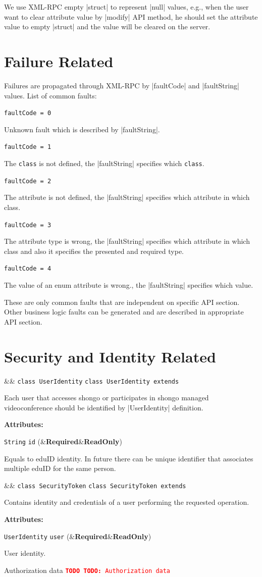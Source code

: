 \documentclass[a4paper]{report}
\newenvironment{Api}{\begin{itemize}}{\end{itemize}}
\newcommand{\ApiCode}[1]{\lstinline[style=styleApi]|#1|}
\newcommand{\ApiValue}[1]{\verb|#1|}
\newcommand{\ApiItem}[1]{\item #1 %

}
\newcommand{\ApiClass}[2]{\ApiItem{%
  \ifx&#2& \ApiCode{class #1} \else \ApiCode{class #1 extends #2} \fi}%
}
\newenvironment{ApiClassAttributes}{%

\begin{samepage}\textbf{Attributes:}\begin{compactitem}}{\end{compactitem}\end{samepage}}
\newcommand{\ApiRequired}{{\color{blue!50!black}\textbf{Required}}}
\newcommand{\ApiReadOnly}{{\color{red!50!black}\textbf{ReadOnly}}}
\newcommand{\ApiClassAttribute}[3]{\ApiItem{\ApiCode{#2} \ApiCode{#1} \hspace{1mm}(\ifx&#3&\ApiReadOnly\else#3\fi)
}}
\newenvironment{ApiFailures}{\begin{compactitem}}{\end{compactitem}}
\newcommand{\ApiFailure}[1]{\ApiItem{\ApiCode{faultCode = #1}}}
\newcommand{\TODO}[1]{%
\def\empty{}%
\def\prvniparametr{#1}%
\ifx\prvniparametr\empty%
\begingroup\tt\textcolor{red}{\noindent\textbf{TODO}}\endgroup
\else%
\begingroup\tt\textcolor{red}{\noindent\textbf{TODO:}\ #1}\endgroup
\fi%
}
\begin{document}
We use XML-RPC empty |struct| to represent |null| values, e.g., when the user want to clear attribute value by |modify| API method, he should set the attribute value to empty |struct| and the value will be cleared on the server.


\section{Failure Related}

Failures are propagated through XML-RPC by |faultCode| and |faultString| values. List of common faults:
\begin{ApiFailures}
\ApiFailure{0} Unknown fault which is described by |faultString|.
\ApiFailure{1} The \ApiValue{class} is not defined, the |faultString| specifies which \ApiValue{class}.
\ApiFailure{2} The attribute is not defined, the |faultString| specifies which attribute in which class.
\ApiFailure{3} The attribute type is wrong, the |faultString| specifies which attribute in which class and also it specifies the presented and required type.
\ApiFailure{4} The value of an enum attribute is wrong., the |faultString| specifies which value.
\end{ApiFailures}
These are only common faults that are independent on specific API section. Other business logic faults can be generated and are described in appropriate API section.


\section{Security and Identity Related}

\begin{Api}

\ApiClass{UserIdentity}{}
Each user that accesses shongo or participates in shongo managed videoconference should be identified by |UserIdentity| definition.
\begin{ApiClassAttributes}
\ApiClassAttribute{id}{String}{\ApiRequired}
Equals to eduID identity. In future there can be unique identifier that associates multiple eduID for the same person.
\end{ApiClassAttributes}


\ApiClass{SecurityToken}{}
Contains identity and credentials of a user performing the requested operation.
\begin{ApiClassAttributes}
\ApiClassAttribute{user}{UserIdentity}{\ApiRequired}
User identity.
\item \TODO{Authorization data}
\end{ApiClassAttributes}

\end{Api}
\end{document}
